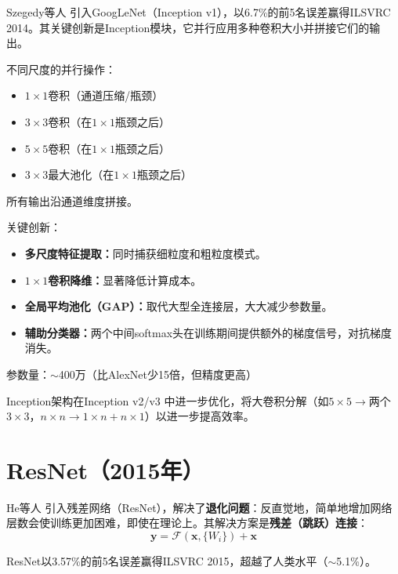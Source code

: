 Szegedy等人 \cite{szegedy2015going}引入GoogLeNet（Inception v1），以6.7\%的前5名误差赢得ILSVRC 2014。其关键创新是Inception模块，它并行应用多种卷积大小并拼接它们的输出。

\begin{architecture}
不同尺度的并行操作：
\begin{itemize}
    \item $1\times1$卷积（通道压缩/瓶颈）
    \item $3\times3$卷积（在$1\times1$瓶颈之后）
    \item $5\times5$卷积（在$1\times1$瓶颈之后）
    \item $3\times3$最大池化（在$1\times1$瓶颈之后）
\end{itemize}
所有输出沿通道维度拼接。
\end{architecture}

关键创新：
\begin{itemize}
    \item \textbf{多尺度特征提取：}同时捕获细粒度和粗粒度模式。
    \item \textbf{$1\times1$卷积降维：}显著降低计算成本。
    \item \textbf{全局平均池化（GAP）：}取代大型全连接层，大大减少参数量。
    \item \textbf{辅助分类器：}两个中间softmax头在训练期间提供额外的梯度信号，对抗梯度消失。
\end{itemize}

参数量：$\sim$400万（比AlexNet少15倍，但精度更高）

Inception架构在Inception v2/v3 \cite{szegedy2016rethinking}中进一步优化，将大卷积分解（如$5\times5 \rightarrow$两个$3\times3$，$n\times n \rightarrow 1\times n + n\times1$）以进一步提高效率。

\section{ResNet（2015年）}

He等人 \cite{he2016deep}引入残差网络（ResNet），解决了\textbf{退化问题}：反直觉地，简单地增加网络层数会使训练更加困难，即使在理论上。其解决方案是\textbf{残差（跳跃）连接}：
\begin{equation}
\mathbf{y} = \mathcal{F}(\mathbf{x}, \{W_i\}) + \mathbf{x}
\end{equation}

ResNet以3.57\%的前5名误差赢得ILSVRC 2015，超越了人类水平（$\sim$5.1\%）。

